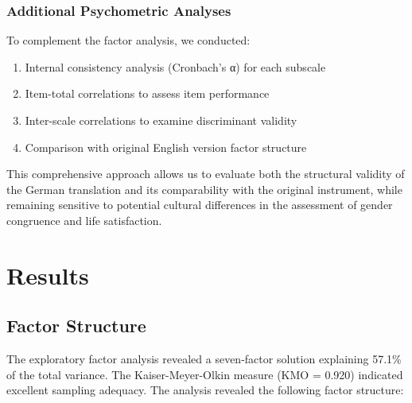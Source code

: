 \documentclass[man,floatsintext,12pt]{apa7}
\begin{document}
\subsubsection{Additional Psychometric
Analyses}\label{additional-psychometric-analyses}

To complement the factor analysis, we conducted:

\begin{enumerate}
\def\labelenumi{\arabic{enumi}.}
\tightlist
\item
  Internal consistency analysis (Cronbach's α) for each subscale
\item
  Item-total correlations to assess item performance
\item
  Inter-scale correlations to examine discriminant validity
\item
  Comparison with original English version factor structure
\end{enumerate}

This comprehensive approach allows us to evaluate both the structural
validity of the German translation and its comparability with the
original instrument, while remaining sensitive to potential cultural
differences in the assessment of gender congruence and life
satisfaction.

\section{Results}\label{results}

\subsection{Factor Structure}\label{factor-structure}

The exploratory factor analysis revealed a seven-factor solution
explaining 57.1\% of the total variance. The Kaiser-Meyer-Olkin measure
(KMO = 0.920) indicated excellent sampling adequacy. The analysis
revealed the following factor structure:
\end{document}
